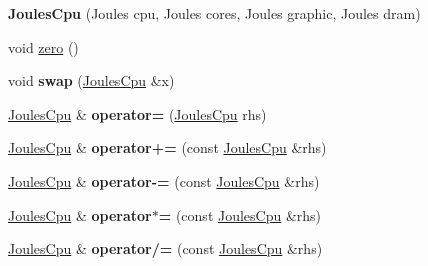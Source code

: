 \begin{DoxyCompactItemize}
\item 
\hypertarget{classmammut_1_1energy_1_1JoulesCpu_ae4fd0bc3cfe0e131d94d69858bdd7892}{{\bfseries Joules\-Cpu} (Joules cpu, Joules cores, Joules graphic, Joules dram)}\label{classmammut_1_1energy_1_1JoulesCpu_ae4fd0bc3cfe0e131d94d69858bdd7892}

\item 
void \hyperlink{classmammut_1_1energy_1_1JoulesCpu_a7a6e400b23e26d0701f314b5fe1b21f5}{zero} ()
\item 
\hypertarget{classmammut_1_1energy_1_1JoulesCpu_a61c5200a76004b09dd1253ed32f6a9ac}{void {\bfseries swap} (\hyperlink{classmammut_1_1energy_1_1JoulesCpu}{Joules\-Cpu} \&x)}\label{classmammut_1_1energy_1_1JoulesCpu_a61c5200a76004b09dd1253ed32f6a9ac}

\item 
\hypertarget{classmammut_1_1energy_1_1JoulesCpu_a6ac87108c47399e37b9af515d8073b9b}{\hyperlink{classmammut_1_1energy_1_1JoulesCpu}{Joules\-Cpu} \& {\bfseries operator=} (\hyperlink{classmammut_1_1energy_1_1JoulesCpu}{Joules\-Cpu} rhs)}\label{classmammut_1_1energy_1_1JoulesCpu_a6ac87108c47399e37b9af515d8073b9b}

\item 
\hypertarget{classmammut_1_1energy_1_1JoulesCpu_afb350f44d1ed7623139e10dede505630}{\hyperlink{classmammut_1_1energy_1_1JoulesCpu}{Joules\-Cpu} \& {\bfseries operator+=} (const \hyperlink{classmammut_1_1energy_1_1JoulesCpu}{Joules\-Cpu} \&rhs)}\label{classmammut_1_1energy_1_1JoulesCpu_afb350f44d1ed7623139e10dede505630}

\item 
\hypertarget{classmammut_1_1energy_1_1JoulesCpu_a6b20192aa4e6be35d914f9cce62f768e}{\hyperlink{classmammut_1_1energy_1_1JoulesCpu}{Joules\-Cpu} \& {\bfseries operator-\/=} (const \hyperlink{classmammut_1_1energy_1_1JoulesCpu}{Joules\-Cpu} \&rhs)}\label{classmammut_1_1energy_1_1JoulesCpu_a6b20192aa4e6be35d914f9cce62f768e}

\item 
\hypertarget{classmammut_1_1energy_1_1JoulesCpu_a8721e6f586965be304d1183cb9f346a6}{\hyperlink{classmammut_1_1energy_1_1JoulesCpu}{Joules\-Cpu} \& {\bfseries operator$\ast$=} (const \hyperlink{classmammut_1_1energy_1_1JoulesCpu}{Joules\-Cpu} \&rhs)}\label{classmammut_1_1energy_1_1JoulesCpu_a8721e6f586965be304d1183cb9f346a6}

\item 
\hypertarget{classmammut_1_1energy_1_1JoulesCpu_a8197d020ac5a0dcfc6ba3ce52d54e8ae}{\hyperlink{classmammut_1_1energy_1_1JoulesCpu}{Joules\-Cpu} \& {\bfseries operator/=} (const \hyperlink{classmammut_1_1energy_1_1JoulesCpu}{Joules\-Cpu} \&rhs)}\label{classmammut_1_1energy_1_1JoulesCpu_a8197d020ac5a0dcfc6ba3ce52d54e8ae}


\end{DoxyCompactItemize}
